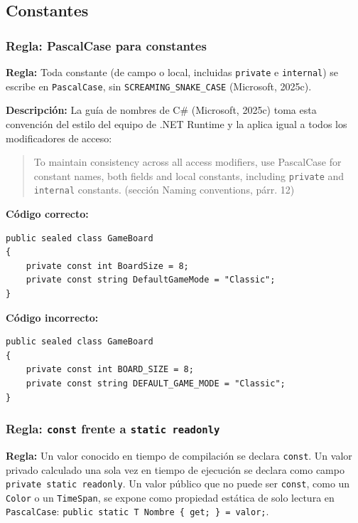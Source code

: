 \subsection{Constantes}

\subsubsection{Regla: PascalCase para constantes}

\textbf{Regla:} Toda constante (de campo o local, incluidas \texttt{private} e \texttt{internal}) se escribe en \texttt{PascalCase}, sin \texttt{SCREAMING\_SNAKE\_CASE} (Microsoft, 2025c).

\textbf{Descripción:} La guía de nombres de C\# (Microsoft, 2025c) toma esta convención del estilo del equipo de .NET Runtime y la aplica igual a todos los modificadores de acceso:
\begin{quote}
To maintain consistency across all access modifiers, use PascalCase for constant names, both fields and local constants, including \texttt{private} and \texttt{internal} constants. (sección Naming conventions, párr. 12)
\end{quote}

\textbf{Código correcto:}
\begin{lstlisting}[style=csharpstyle]
public sealed class GameBoard
{
    private const int BoardSize = 8;
    private const string DefaultGameMode = "Classic";
}
\end{lstlisting}

\textbf{Código incorrecto:}
\begin{lstlisting}[style=csharpstyle]
public sealed class GameBoard
{
    private const int BOARD_SIZE = 8;
    private const string DEFAULT_GAME_MODE = "Classic";
}
\end{lstlisting}

\subsubsection{Regla: \texttt{const} frente a \texttt{static readonly}}

\textbf{Regla:} Un valor conocido en tiempo de compilación se declara \texttt{const}. Un valor privado calculado una sola vez en tiempo de ejecución se declara como campo \texttt{private static readonly}. Un valor público que no puede ser \texttt{const}, como un \texttt{Color} o un \texttt{TimeSpan}, se expone como propiedad estática de solo lectura en \texttt{PascalCase}: \texttt{public static T Nombre \{ get; \} = valor;}.

